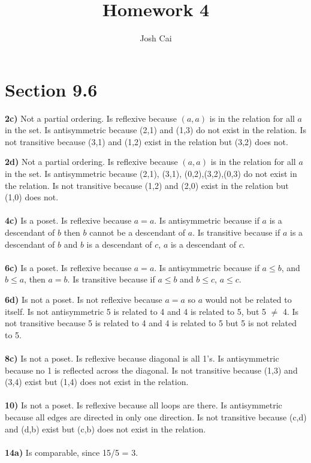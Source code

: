 \documentclass{article}
\begin{document}
\title{Homework 4}
\author{Josh Cai}

\maketitle
\section*{Section 9.6}


\textbf{2c)} Not a partial ordering. Is reflexive because $(a,a)$ is in the relation for all $a$ in the set. Is antisymmetric because (2,1) and (1,3) do not exist in the relation. Is not transitive because (3,1) and (1,2) exist in the relation but (3,2) does not.

\noindent\textbf{2d)} Not a partial ordering. Is reflexive because $(a,a)$ is in the relation for all $a$ in the set. Is antisymmetric because (2,1), (3,1), (0,2),(3,2),(0,3) do not exist in the relation. Is not transitive because (1,2) and (2,0) exist in the relation but (1,0) does not.
\\\\\noindent\textbf{4c)} Is a poset. Is reflexive because $a=a$. Is antisymmetric because if $a$ is a descendant of $b$ then $b$ cannot be a descendant of $a$. Is transitive because if $a$ is a descendant of $b$ and $b$ is a descendant of $c$, $a$ is a descendant of $c$.
\\\\\noindent\textbf{6c)} Is a poset. Is reflexive because $a=a$. Is antisymmetric because if $a \le b$, and $b \le a$, then $a=b$. Is transitive because if $a\le b$ and $b\le c$, $a\le c$.

\noindent\textbf{6d)} Is not a poset. Is not reflexive because $a=a$ so $a$ would not be related to itself. Is not antisymmetric 5 is related to 4 and 4 is related to 5, but 5 $\neq$ 4. Is not transitive because 5 is related to 4 and 4 is related to 5 but 5 is not related to 5.
\\\\\noindent\textbf{8c)} Is not a poset. Is reflexive because diagonal is all 1's. Is antisymmetric because no 1 is reflected across the diagonal. Is not transitive because (1,3) and (3,4) exist but (1,4) does not exist in the relation.
\\\\\noindent\textbf{10)} Is not a poset. Is reflexive because all loops are there. Is antisymmetric because all edges are directed in only one direction. Is not transitive because (c,d) and (d,b) exist but (c,b) does not exist in the relation.
\\\\\noindent\textbf{14a)} Is comparable, since 15/5 = 3.
\end{document}
